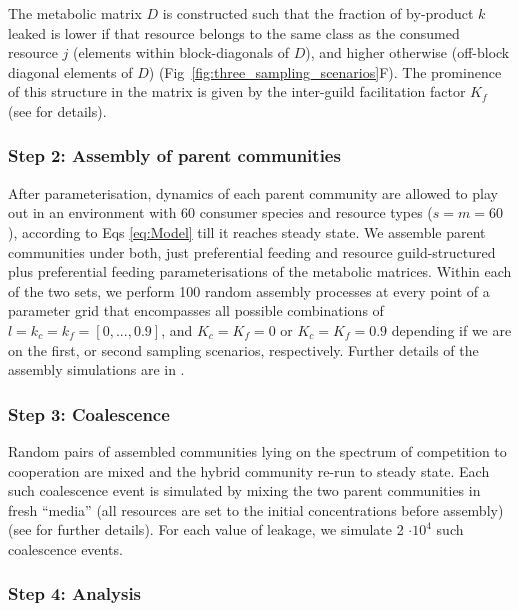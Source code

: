 \documentclass[10pt,letterpaper]{article}
\begin{document}
The metabolic matrix $D$ is constructed such that the fraction of by-product $k$ leaked is lower if that resource belongs to the same class as the consumed resource $j$ (elements within block-diagonals of $D$), and higher otherwise (off-block diagonal elements of $D$) (Fig~\ref{fig:three_sampling_scenarios}F). The prominence of this structure in the matrix is given by the inter-guild facilitation factor $K_f$ (see  for details).

\subsubsection*{Step 2: Assembly of parent communities}\vspace{-5pt}

After parameterisation, dynamics of each parent community are allowed to play out in an environment with 60 consumer species and resource types ($s = m = 60$), according to Eqs \ref{eq:Model} till it reaches steady state. We assemble parent communities under both, just preferential feeding and resource guild-structured plus preferential feeding parameterisations of the metabolic matrices. Within each of the two sets, we perform 100 random assembly processes at every point of a parameter grid that encompasses all possible combinations of $l = k_c = k_f = [0,...,0.9]$, and $K_c = K_f = 0$ or $K_c = K_f = 0.9$ depending if we are on the first, or second sampling scenarios, respectively. Further details of the assembly simulations are in .

\subsubsection*{Step 3: Coalescence}\vspace{-5pt}

Random pairs of assembled communities lying on the spectrum of competition to cooperation are mixed and the hybrid community re-run to steady state. Each such coalescence event is simulated by mixing the two parent communities in fresh ``media'' (all resources are set to the initial concentrations before assembly) (see  for further details). For each value of leakage, we simulate 2 $\cdot 10^4$ such coalescence events.

\subsubsection*{Step 4: Analysis}\vspace{-5pt}
\end{document}
